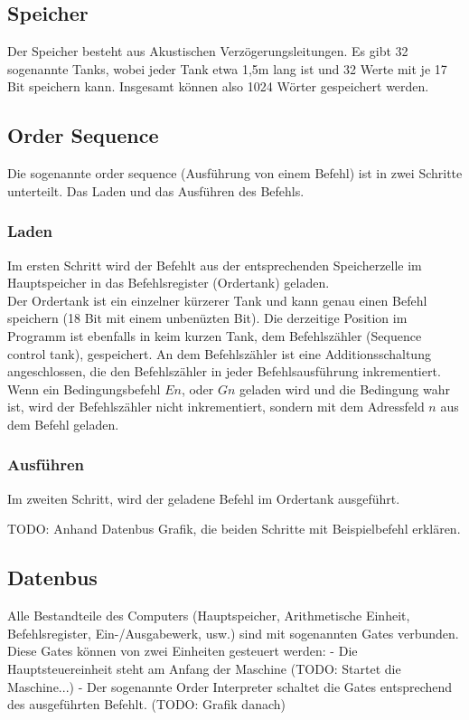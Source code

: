 \documentclass[12pt]{report}
\begin{document}
\subsection{Speicher}

Der Speicher besteht aus Akustischen Verzögerungsleitungen. Es gibt 32 sogenannte Tanks, wobei 
jeder Tank etwa 1,5m lang ist und 32 Werte mit je 17 Bit speichern kann. Insgesamt können also
1024 Wörter gespeichert werden. ~\cite{theedsac}

\subsection{Order Sequence}

Die sogenannte order sequence (Ausführung von einem Befehl) ist in zwei Schritte unterteilt. Das Laden und das Ausführen des Befehls.

\subsubsection{Laden}
Im ersten Schritt wird der Befehlt aus der entsprechenden Speicherzelle im Hauptspeicher in das Befehlsregister (Ordertank) geladen.\\
Der Ordertank ist ein einzelner kürzerer Tank und kann genau einen Befehl speichern (18 Bit mit einem unbenüzten Bit). Die derzeitige Position im Programm ist ebenfalls in keim kurzen Tank, dem Befehlszähler (Sequence control tank), gespeichert. An dem Befehlszähler ist eine Additionsschaltung angeschlossen, die den Befehlszähler in jeder Befehlsausführung inkrementiert. Wenn ein Bedingungsbefehl $En$, oder $Gn$ geladen wird und die Bedingung wahr ist, wird der Befehlszähler nicht inkrementiert, sondern mit dem Adressfeld $n$ aus dem Befehl geladen.~\cite{theedsac}

\subsubsection{Ausführen}
Im zweiten Schritt, wird der geladene Befehl im Ordertank ausgeführt.~\cite{theedsac}

TODO: Anhand Datenbus Grafik, die beiden Schritte mit Beispielbefehl erklären.

\subsection{Datenbus}

Alle Bestandteile des Computers (Hauptspeicher, Arithmetische Einheit, Befehlsregister, Ein-/Ausgabewerk, usw.) sind mit sogenannten Gates verbunden.
Diese Gates können von zwei Einheiten gesteuert werden:
- Die Hauptsteuereinheit steht am Anfang der Maschine (TODO: Startet die Maschine...)
- Der sogenannte Order Interpreter schaltet die Gates entsprechend des ausgeführten Befehlt. (TODO: Grafik danach)
\end{document}
